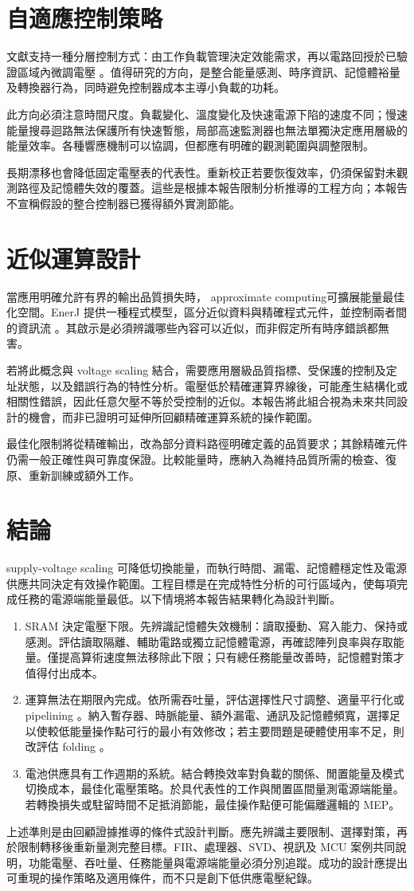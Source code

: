 \section{自適應控制策略}
文獻支持一種分層控制方式：由工作負載管理決定效能需求，再以電路回授於已驗證區域內微調電壓 \cite{gonzalez1997,udvs2010}。值得研究的方向，是整合能量感測、時序資訊、記憶體裕量及轉換器行為，同時避免控制器成本主導小負載的功耗。

此方向必須注意時間尺度。負載變化、溫度變化及快速電源下陷的速度不同；慢速能量搜尋迴路無法保護所有快速暫態，局部高速監測器也無法單獨決定應用層級的能量效率。各種響應機制可以協調，但都應有明確的觀測範圍與調整限制。

長期漂移也會降低固定電壓表的代表性。重新校正若要恢復效率，仍須保留對未觀測路徑及記憶體失效的覆蓋。這些是根據本報告限制分析推導的工程方向；本報告不宣稱假設的整合控制器已獲得額外實測節能。

\section{近似運算設計}
當應用明確允許有界的輸出品質損失時， approximate computing可擴展能量最佳化空間。EnerJ 提供一種程式模型，區分近似資料與精確程式元件，並控制兩者間的資訊流 \cite{sampson2011}。其啟示是必須辨識哪些內容可以近似，而非假定所有時序錯誤都無害。

若將此概念與 voltage scaling 結合，需要應用層級品質指標、受保護的控制及定址狀態，以及錯誤行為的特性分析。電壓低於精確運算界線後，可能產生結構化或相關性錯誤，因此任意欠壓不等於受控制的近似。本報告將此組合視為未來共同設計的機會，而非已證明可延伸所回顧精確運算系統的操作範圍。

最佳化限制將從精確輸出，改為部分資料路徑明確定義的品質要求；其餘精確元件仍需一般正確性與可靠度保證。比較能量時，應納入為維持品質所需的檢查、復原、重新訓練或額外工作。

\clearpage
\section{結論}
 supply-voltage scaling 可降低切換能量，而執行時間、漏電、記憶體穩定性及電源供應共同決定有效操作範圍。工程目標是在完成特性分析的可行區域內，使每項完成任務的電源端能量最低。以下情境將本報告結果轉化為設計判斷。

\begin{enumerate}
\item \textnormal{SRAM 決定電壓下限。}先辨識記憶體失效機制：讀取擾動、寫入能力、保持或感測。評估讀取隔離、輔助電路或獨立記憶體電源，再確認陣列良率與存取能量。僅提高算術速度無法移除此下限；只有總任務能量改善時，記憶體對策才值得付出成本。
\item \textnormal{運算無法在期限內完成。}依所需吞吐量，評估選擇性尺寸調整、適量平行化或 pipelining 。納入暫存器、時脈能量、額外漏電、通訊及記憶體頻寬，選擇足以使較低能量操作點可行的最小有效修改；若主要問題是硬體使用率不足，則改評估 folding 。
\item \textnormal{電池供應具有工作週期的系統。}結合轉換效率對負載的關係、閒置能量及模式切換成本，最佳化電壓策略。於具代表性的工作與閒置區間量測電源端能量。若轉換損失或駐留時間不足抵消節能，最佳操作點便可能偏離邏輯的 MEP。
\end{enumerate}

上述準則是由回顧證據推導的條件式設計判斷。應先辨識主要限制、選擇對策，再於限制轉移後重新量測完整目標。FIR、處理器、SVD、視訊及 MCU 案例共同說明，功能電壓、吞吐量、任務能量與電源端能量必須分別追蹤。成功的設計應提出可重現的操作策略及適用條件，而不只是創下低供應電壓紀錄。

